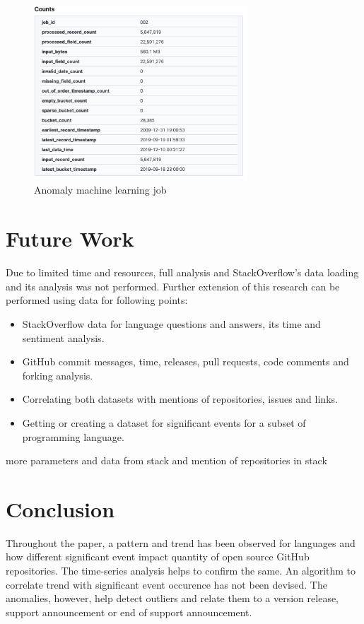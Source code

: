 \documentclass[12pt,conference]{IEEEtran}
\begin{document}
\begin{figure}[h!]
  \centering
  \includegraphics[width=8cm]{mljob.png}
  \caption{Anomaly machine learning job}
  \label{fig:mlj}
\end{figure}


\section{Future Work}
Due to limited time and resources, full analysis and StackOverflow's data loading and its analysis was not performed. Further extension of this research can be performed using data for following points:
\begin{itemize}
  \item StackOverflow data for language questions and answers, its time and sentiment analysis.
  \item GitHub commit messages, time, releases, pull requests, code comments and forking analysis.
  \item Correlating both datasets with mentions of repositories, issues and links.
  \item Getting or creating a dataset for significant events for a subset of programming language.
\end{itemize}
more parameters and data from stack and mention of repositories in stack

\section{Conclusion}
Throughout the paper, a pattern and trend has been observed for languages and how different significant event impact quantity of open source GitHub repositories. The time-series analysis helps to confirm the same. An algorithm to correlate trend with significant event occurence has not been devised. The anomalies, however, help detect outliers and relate them to a version release, support announcement or end of support announcement. 
\end{document}
